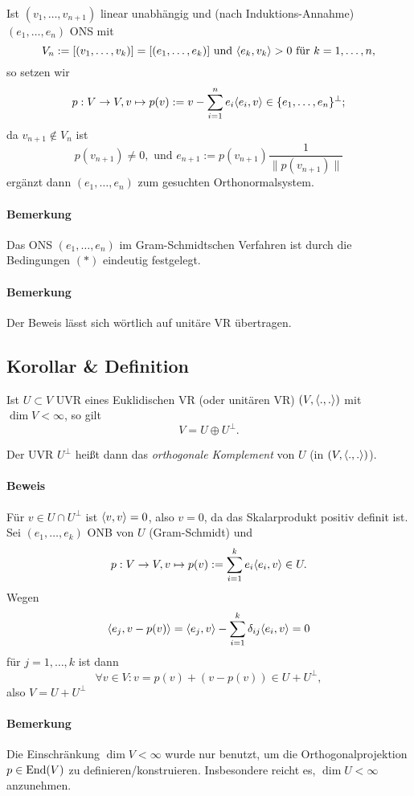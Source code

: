 	Ist $ (v_1,\dots,v_{n+1}) $ linear unabhängig und (nach Induktions-Annahme) $ (e_1,\dots,e_n) $ ONS mit
		\[ V_n := [(v_1,\dots,v_k)] = [(e_1,\dots,e_k)] \text{ und } \langle e_k,v_k \rangle > 0 \text{ für } k = 1,\dots,n, \]
	so setzen wir
		\[ p:V\to V, v\mapsto p(v):= v-\sum_{i=1}^{n}e_i\langle e_i,v \rangle\in \{e_1,\dots,e_n\}^\perp; \]
	da $ v_{n+1}\notin V_n $ ist
		\[ p(v_{n+1}) \neq 0, \text{ und } e_{n+1} := p(v_{n+1})\frac{1}{\|p(v_{n+1})\|} \]
	ergänzt dann $ (e_1,\dots,e_n) $ zum gesuchten Orthonormalsystem.
\paragraph{Bemerkung}
	Das ONS $ (e_1,\dots,e_n) $ im Gram-Schmidtschen Verfahren ist durch die Bedingungen $ (*) $ eindeutig festgelegt.
\paragraph{Bemerkung}
	Der Beweis lässt sich wörtlich auf unitäre VR übertragen.

\subsection{Korollar \& Definition}
\begin{Korollar}
	Ist $ U\subset V $ UVR eines Euklidischen VR (oder unitären VR) $ (V,\langle .,. \rangle) $ mit $ \dim V<\infty $, so gilt
		\[ V = U\oplus U^\perp. \]
\end{Korollar}
\begin{Definition}
	Der UVR $ U^\perp $ heißt dann das \emph{orthogonale Komplement} von $ U $ (in $ (V,\langle .,. \rangle) $).
\end{Definition}
\paragraph{Beweis}
	Für $ v\in U\cap U^\perp $ ist $ \langle v,v \rangle = 0 $, also $ v = 0 $, da das Skalarprodukt positiv definit ist. Sei $ (e_1,\dots,e_k) $ ONB von $ U $ (Gram-Schmidt) und
		\[ p:V\to V, v\mapsto p(v) := \sum_{i=1}^{k}e_i\langle e_i,v \rangle\in U. \]
	Wegen
		\[ \langle e_j,v-p(v) \rangle = \langle e_j,v \rangle-\sum_{i=1}^{k}\delta_{ij}\langle e_i,v \rangle = 0 \]
	für $ j = 1,\dots, k $ ist dann
		\[ \forall v\in V:v=p(v) + (v-p(v))\in U+U^\perp, \]
	also $ V = U+U^\perp $
\paragraph{Bemerkung}
	Die Einschränkung $ \dim V < \infty $ wurde nur benutzt, um die Orthogonalprojektion $ p\in \operatorname{End}(V) $ zu definieren/konstruieren. Insbesondere reicht es, $ \dim U < \infty $ anzunehmen.
